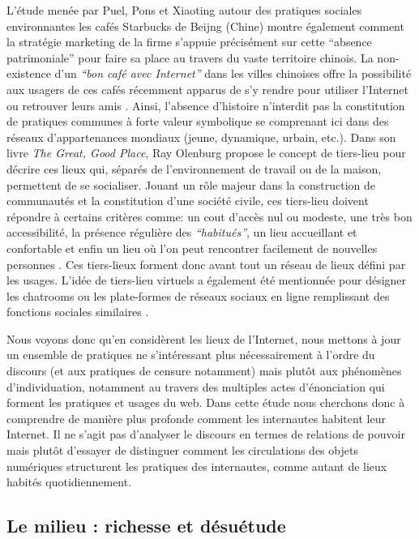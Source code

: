L’étude menée par Puel, Pons et Xiaoting autour des pratiques sociales environnantes les cafés Starbucks de Beijng (Chine) montre également comment la stratégie marketing de la firme s’appuie précisément sur cette “absence patrimoniale” pour faire sa place au travers du vaste territoire chinois. La non-existence d’un \textit{“bon café avec Internet”} dans les villes chinoises offre la possibilité aux usagers de ces cafés récemment apparus de s’y rendre pour utiliser l’Internet ou retrouver leurs amis \citep{Puel2007}. Ainsi, l’absence d’histoire n’interdit pas la constitution de pratiques communes à forte valeur symbolique se comprenant ici dans des réseaux d’appartenances mondiaux (jeune, dynamique, urbain, etc.). Dans son livre \textit{The Great, Good Place}, Ray Olenburg propose le concept de tiers-lieu pour décrire ces lieux qui, séparés de l’environnement de travail ou de la maison, permettent de se socialiser. Jouant un rôle majeur dans la construction de communautés et la constitution d’une société civile, ces tiers-lieu doivent répondre à certains critères comme: un cout d’accès nul ou modeste, une très bon accessibilité, la présence régulière des \textit{``habitués''}, un lieu accueillant et confortable et enfin un lieu où l’on peut rencontrer facilement de nouvelles personnes \citep{Oldenburg1999}. Ces tiers-lieux forment donc avant tout un réseau de lieux défini par les usages. L’idée de tiers-lieu virtuels a également été mentionnée pour désigner les chatrooms ou les plate-formes de réseaux sociaux en ligne remplissant des fonctions sociales similaires \citep{Soukup2006}.

Nous voyons donc qu’en considèrent les lieux de l’Internet, nous mettons à jour un ensemble de pratiques ne s’intéressant plus nécessairement à l’ordre du discours (et aux pratiques de censure notamment) mais plutôt aux phénomènes d’individuation, notamment au travers des multiples actes d’énonciation qui forment les pratiques et usages du web. Dans cette étude nous cherchons donc à comprendre de manière plus profonde comment les internautes habitent leur Internet. Il ne s’agit pas d’analyser le discours en termes de relations de pouvoir mais plutôt d’essayer de distinguer comment les circulations des objets numériques structurent les pratiques des internautes, comme autant de lieux habités quotidiennement.

\subsection[Le milieu : richesse et désuétude ]{Le milieu : richesse et désuétude }

